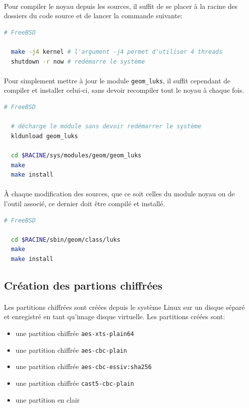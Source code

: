 \paragraph{}
Pour compiler le noyau depuis les sources, il suffit de se placer à la racine
des dossiers du code source et de lancer la commande suivante:
\\
\begin{lstlisting}[language=bash]
  # FreeBSD

  make -j4 kernel # l'argument -j4 permet d'utiliser 4 threads 
  shutdown -r now # redémarre le système
\end{lstlisting}
\paragraph{}
Pour simplement mettre à jour le module \texttt{geom\_luks}, il suffit cependant
de compiler et installer celui-ci, sans devoir recompiler tout le noyau à chaque
fois.
\\
\begin{lstlisting}[language=bash]
  # FreeBSD

  # décharge le module sans devoir redémarrer le système
  kldunload geom_luks

  cd $RACINE/sys/modules/geom/geom_luks
  make
  make install
\end{lstlisting}
\paragraph{}
À chaque modification des sources, que ce soit celles du module noyau ou de
l'outil associé, ce dernier doit être compilé et installé.
\\
\begin{lstlisting}[language=bash]
  # FreeBSD

  cd $RACINE/sbin/geom/class/luks
  make
  make install
\end{lstlisting}


\subsection{Création des partions chiffrées}
\paragraph{}
Les partitions chiffrées sont créées depuis le système Linux sur un disque
séparé et enregistré en tant qu'image disque virtuelle. Les partitions créées
sont:
\begin{itemize}
\item une partition chiffrée \texttt{aes-xts-plain64}
\item une partition chiffrée \texttt{aes-cbc-plain}
\item une partition chiffrée \texttt{aes-cbc-essiv:sha256}
\item une partition chiffrée \texttt{cast5-cbc-plain}
\item une partition en clair
\end{itemize}
